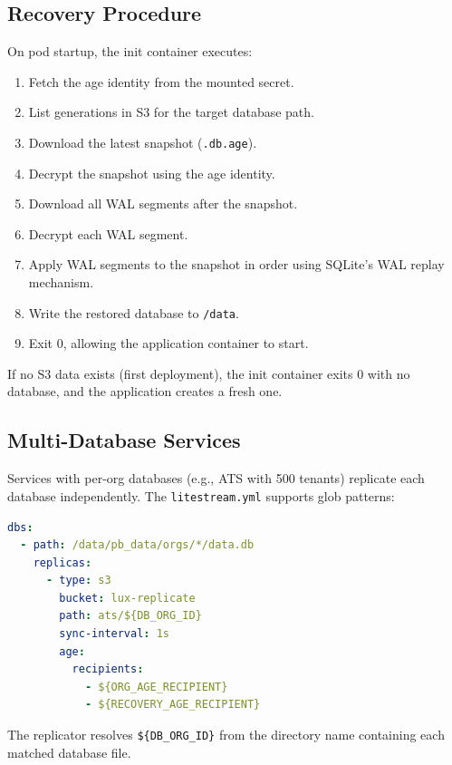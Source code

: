\documentclass[11pt,a4paper]{article}
\begin{document}
\subsection{Recovery Procedure}\label{sec:recovery}

On pod startup, the init container executes:

\begin{enumerate}[nosep]
  \item Fetch the age identity from the mounted secret.
  \item List generations in S3 for the target database path.
  \item Download the latest snapshot (\texttt{.db.age}).
  \item Decrypt the snapshot using the age identity.
  \item Download all WAL segments after the snapshot.
  \item Decrypt each WAL segment.
  \item Apply WAL segments to the snapshot in order using SQLite's
    WAL replay mechanism.
  \item Write the restored database to \texttt{/data}.
  \item Exit 0, allowing the application container to start.
\end{enumerate}

If no S3 data exists (first deployment), the init container exits 0
with no database, and the application creates a fresh one.

\subsection{Multi-Database Services}\label{sec:multidb}

Services with per-org databases (e.g., ATS with 500 tenants) replicate
each database independently. The \texttt{litestream.yml} supports
glob patterns:

\begin{lstlisting}[language=YAML,caption={Multi-database replication.}]
dbs:
  - path: /data/pb_data/orgs/*/data.db
    replicas:
      - type: s3
        bucket: lux-replicate
        path: ats/${DB_ORG_ID}
        sync-interval: 1s
        age:
          recipients:
            - ${ORG_AGE_RECIPIENT}
            - ${RECOVERY_AGE_RECIPIENT}
\end{lstlisting}

The replicator resolves \texttt{\$\{DB\_ORG\_ID\}} from the directory
name containing each matched database file.
\end{document}
